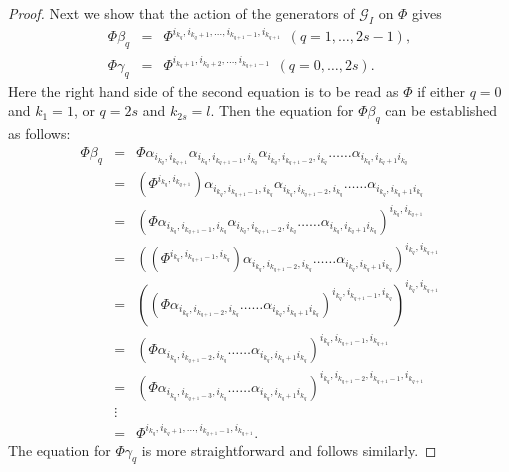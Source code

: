 \documentclass[12pt]{article}
\renewcommand{\>}{\rangle}
\theoremstyle{definition}\newtheorem{definition}{Definition}[section]
\begin{document}
\begin{proof}
Next we show that the action of the generators of $\mathcal{G}_{I}$ on $\Phi$ gives
\begin{eqnarray*}
\Phi \beta_q      &\!=\!& \Phi^{i_{k_{q}}, i_{k_q+1}, \dots, i_{k_{q+1}-1} , i_{k_{q+1}}} \;\,(q=1,\ldots,2s-1), \\ 
\Phi \gamma_q &\!=\!& \Phi^{i_{k_q+1}, i_{k_q+2}, \dots, i_{k_{q+1}-1}} \;\,(q=0,\ldots,2s).
\end{eqnarray*}
Here the right hand side of the second equation is to be read as $\Phi$ if either $q=0$ and $k_{1}=1$, or $q=2s$ and $k_{2s}=l$. Then the equation for $\Phi\beta_q $ can be established as follows:
\[\begin{array}{lll}
\Phi \beta_q 
&=& \Phi \alpha_{i_{k_q},i_{k_{q+1}}} \alpha_{i_{k_q}, i_{k_{q+1}-1}, i_{k_q}} \alpha_{i_{k_q}, i_{k_{q+1}-2}, i_{k_q}} \ldots\ldots \alpha_{i_{k_q}, i_{k_q+1} i_{k_q}}\\[.05in]
&=& (\Phi^{i_{k_q},i_{k_{q+1}}}) \alpha_{i_{k_q}, i_{k_{q+1}-1}, i_{k_q}} \alpha_{i_{k_q}, i_{k_{q+1}-2}, i_{k_q}} \ldots\ldots \alpha_{i_{k_q}, i_{k_q+1} i_{k_q}}\\[.05in]
&=& (\Phi \alpha_{i_{k_q}, i_{k_{q+1}-1}, i_{k_q}} \alpha_{i_{k_q}, i_{k_{q+1}-2}, i_{k_q}} \ldots\ldots \alpha_{i_{k_q}, i_{k_q+1} i_{k_q}})^{i_{k_q},i_{k_{q+1}}}\\[.05in]
&=& ((\Phi^{i_{k_q}, i_{k_{q+1}-1}, i_{k_q}}) \alpha_{i_{k_q}, i_{k_{q+1}-2}, i_{k_q}} \ldots\ldots \alpha_{i_{k_q}, i_{k_q+1} i_{k_q}})^{i_{k_q},i_{k_{q+1}}}\\[.05in]
&=& ((\Phi \alpha_{i_{k_q}, i_{k_{q+1}-2}, i_{k_q}} \ldots\ldots \alpha_{i_{k_q}, i_{k_q+1} i_{k_q}})^{i_{k_q}, i_{k_{q+1}-1}, i_{k_q}})^{i_{k_q},i_{k_{q+1}}}\\[.05in]
&=& (\Phi \alpha_{i_{k_q}, i_{k_{q+1}-2}, i_{k_q}} \ldots\ldots \alpha_{i_{k_q}, i_{k_q+1} i_{k_q}})^{i_{k_q}, i_{k_{q+1}-1},i_{k_{q+1}}}\\[.05in]
&=& (\Phi \alpha_{i_{k_q}, i_{k_{q+1}-3}, i_{k_q}} \ldots\ldots \alpha_{i_{k_q}, i_{k_q+1} i_{k_q}})^{i_{k_q},i_{k_{q+1}-2},i_{k_{q+1}-1},i_{k_{q+1}}}\\[.02in]
&\vdots&\\[.02in]
&=& \Phi^{i_{k_{q}}, i_{k_q+1}, \dots, i_{k_{q+1}-1} , i_{k_{q+1}}}.
\end{array} \]
The equation for $\Phi \gamma_q$ is more straightforward and follows similarly.


\end{proof}
\end{document}
